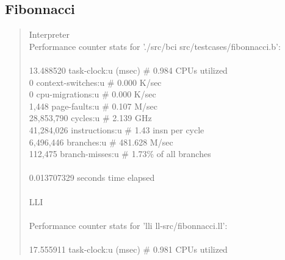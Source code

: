 \documentclass[12pt]{report}
\begin{document}
\subsection*{Fibonnacci}

\begin{quote}
 Interpreter \\ 
 Performance counter stats for './src/bci src/testcases/fibonnacci.b':             \\     
                                                                                   \\ 
         13.488520      task-clock:u (msec)       \#    0.984 CPUs utilized        \\   
                 0      context-switches:u        \#    0.000 K/sec                \\   
                 0      cpu-migrations:u          \#    0.000 K/sec                \\   
             1,448      page-faults:u             \#    0.107 M/sec                \\   
        28,853,790      cycles:u                  \#    2.139 GHz                  \\   
        41,284,026      instructions:u            \#    1.43  insn per cycle       \\   
         6,496,446      branches:u                \#  481.628 M/sec                \\   
           112,475      branch-misses:u           \#    1.73\% of all branches     \\    
                                                                                   \\ 
       0.013707329 seconds time elapsed                                            \\ 
                                                                                   \\ 
LLI                                                                                     \\ 
                                                                                   \\ 
 Performance counter stats for 'lli ll-src/fibonnacci.ll':                         \\ 
                                                                                   \\ 
         17.555911      task-clock:u (msec)       \#    0.981 CPUs utilized        \\   

\end{quote}
\end{document}
